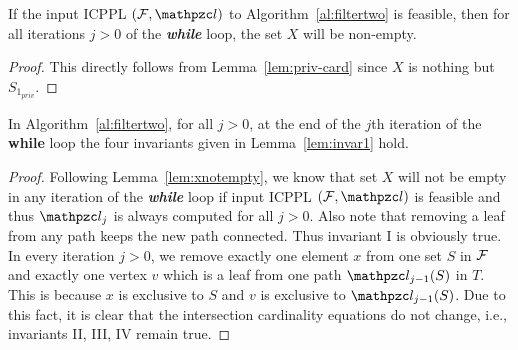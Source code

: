 \begin{lemma}
  \label{lem:xnotempty}
  If the input ICPPL $(\cF, \cl)$ to Algorithm~\ref{al:filtertwo} is
  feasible, then for all iterations $j > 0$ of the {\em \bf while}
  loop, the set $X$ will be non-empty.
\end{lemma}
\begin{proof}\thesisspacing
This directly follows from Lemma~\ref{lem:priv-card} since $X$ is
nothing but $S_{1_{priv}}$.
\end{proof}

\begin{lemma}
  \label{lem:invar3}
  In Algorithm~\ref{al:filtertwo}, for all $j > 0$, at the end of the
  $j$th iteration of the {\bf while} loop the four invariants given in
  Lemma~\ref{lem:invar1} hold.
\end{lemma}
\begin{proof}\thesisspacing
  Following Lemma~\ref{lem:xnotempty}, we know that set $X$ will not
  be empty in any iteration of the {\em \bf while} loop if input ICPPL
  $(\cF, \cl)$ is feasible and thus $\cl_j$ is always computed for all
  $j > 0$. Also note that removing a leaf from any path keeps the new
  path connected. Thus invariant I is obviously true. In every
  iteration $j > 0$, we remove exactly one element $x$ from one set
  $S$ in ${\cal F}$ and exactly one vertex $v$ which is a leaf from one
  path $\cl_{j-1}(S)$ in $T$. This is because $x$ is exclusive to $S$
  and $v$ is exclusive to $\cl_{j-1}(S)$. Due to this fact, it is
  clear that the intersection cardinality equations do not change,
  i.e., invariants II, III, IV remain true. %
\end{proof}


